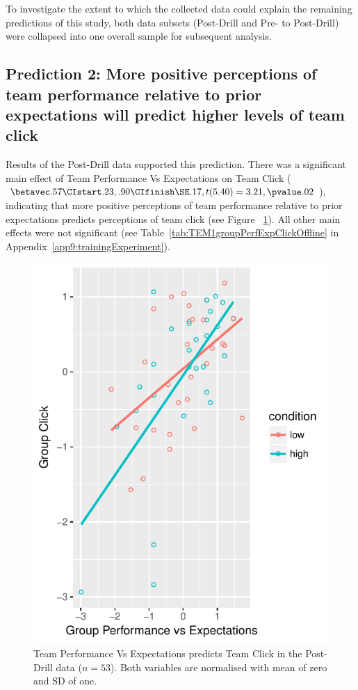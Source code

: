 \begin{CJK}{UTF8}{gbsn}
To investigate the extent to which the collected data could explain the remaining predictions of this study, both data subsets (Post-Drill and Pre- to Post-Drill) were collapsed into one overall sample for subsequent analysis.



\subsection{Prediction 2: More positive perceptions of team performance relative to prior expectations will predict higher levels of team click}

Results of the Post-Drill data supported this prediction. There was a significant main effect of Team Performance Vs Expectations on Team Click ($\betavec .57 \CIstart .23, .90 \CIfinish \SE .17, t(5.40) = 3.21, \pvalue .02$), indicating that more positive perceptions of team performance relative to prior expectations predicts perceptions of team click (see Figure ~\ref{fig:teamPerfExpClickScatter}).  All other main effects were not significant (see Table~\ref{tab:TEM1groupPerfExpClickOffline} in Appendix~\ref{app9:trainingExperiment}).


\begin{figure}
    \centering
    \includegraphics[width=0.5\linewidth,keepaspectratio] {images/teamPerfExpClickScatter}
    \caption{Team Performance Vs Expectations predicts Team Click in the Post-Drill data ($n = 53$).  Both variables are normalised with mean of zero and SD of one.}
    \label{fig:teamPerfExpClickScatter}
\end{figure}


\end{CJK}
